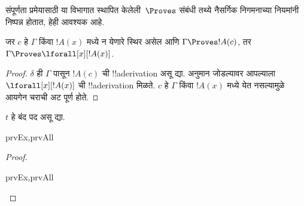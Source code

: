\documentclass[../../../include/open-logic-section]{subfiles}
\begin{document}


\begin{explain}
  संपूर्णता प्रमेयासाठी या विभागात स्थापित केलेली~$\Proves$ संबंधी तथ्ये
  नैसर्गिक निगमनाच्या नियमांनी निष्पन्न होतात, हेही आवश्यक आहे.
\end{explain}

\begin{thm}
 जर $c$ हे $\Gamma$ किंवा $!A(x)$ मध्ये
न येणारे स्थिर असेल आणि $\Gamma \Proves !A(c)$, तर $\Gamma
\Proves \lforall[x][!A(x)]$.
\end{thm}

\begin{proof}
$\delta$ ही $\Gamma$ पासून $!A(c)$ ची !!a{derivation} असू द्या.
\Intro{\lforall} अनुमान जोडल्यावर आपल्याला $\lforall[x][!A(x)]$ ची
!!a{derivation} मिळते. $c$ हे $\Gamma$ किंवा $!A(x)$ मध्ये येत नसल्यामुळे
आयगेन चराची अट पूर्ण होते.
\end{proof}

\begin{prop}
$t$ हे बंद पद असू द्या.
\begin{tagenumerate}{prvEx,prvAll}

\end{tagenumerate}
\end{prop}

\begin{proof}
\begin{tagenumerate}{prvEx,prvAll}

\end{tagenumerate}
\end{proof}
\end{document}
